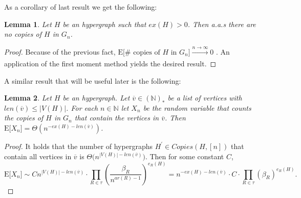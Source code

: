 \documentclass[12pt,notitlepage,a4paper]{article}
\newtheorem{lemma}{Lemma}[section]
\theoremstyle{definition}
\newcommand{\N}{\mathbb{N}}
\begin{document}
As a corollary of last result we get the following:  
\begin{lemma} \label{lem:nocopiesdense}
	Let $H$ be an hypergraph such that $ex(H)>0$. Then
	a.a.s there are no copies of $H$ in $G_n$. 
\end{lemma}  
\begin{proof}
	Because of the previous fact, 
	$\mathrm{E}\big[\# \text{ copies of }H \text{ in } G_n\big] 
	\xrightarrow[]{n\to \infty} 0$ . An application of the first moment
	method yields the desired result. 
\end{proof} 



A similar result that will be useful later is the following:

%
%

\begin{lemma}\label{lem:nocopiesfixed}
	Let $H$ be an hypergraph. Let
	$\overline{v}\in (\N)_*$ be a list of vertices
	with $len(\overline{v})\leq |V(H)|$.
	For each $n\in \N$ 
	let $X_n$ be the random variable that
	counts the copies of $H$ in $G_n$ that contain the vertices
	in $\overline{v}$. Then
	$\mathrm{E}\big[ X_n \big]=\Theta(n^{-ex(H)-len(\overline{v})})$.	
\end{lemma}
\begin{proof}
	It holds that the number of hypergraphs $H^\prime \in Copies(H,[n])$
	that contain all vertices in $\overline{v}$ is
	 $\Theta\big(n^{|V(H)|-len(\overline{v})}\big)$. Then for
	 some constant $C$,
	\[
	\mathrm{E}\big[ X_n \big]\sim 
	C n^{|V(H)|-len(\overline{v})}
	\cdot\prod_{R\in\tau} \left( \frac{\beta_R}{n^{ar(R)-1}}\right)^{e_R(H)}=
	n^{-ex(H)-len(\overline{v})}\cdot C \cdot
	\prod_{R\in\tau} \left( \beta_R \right)^{e_R(H)}.
	\]
\end{proof}
\end{document}
